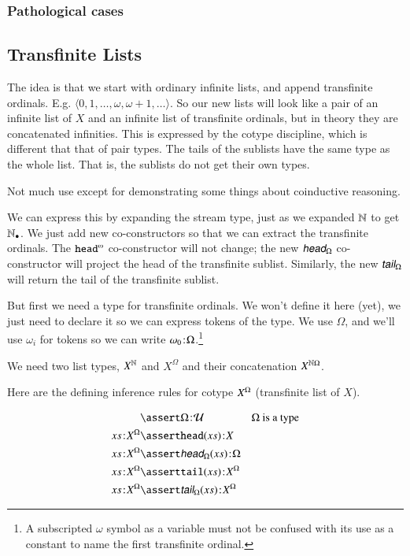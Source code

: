 \subsubsection{Pathological cases}

\subsection{Transfinite Lists}

The idea is that we start with ordinary infinite lists, and append
transfinite ordinals. E.g. \(\langle 0, 1, \ldots, \omega, \omega+1,
\ldots\rangle\). So our new lists will look like a pair of an infinite
list of \(X\) and an infinite list of transfinite ordinals, but in
theory they are concatenated infinities. This is expressed by the
cotype discipline, which is different that that of pair types. The
tails of the sublists have the same type as the whole list. That is,
the sublists do not get their own types.

Not much use except for demonstrating some things about coinductive
reasoning.

We can express this by expanding the stream type, just as we expanded
\(\mathbb{N}\) to get \(\mathbb{N}_{\bullet}\). We just add new co-constructors so that we
can extract the transfinite ordinals. The \(\cohead\) co-constructor
will not change; the new \(\xcohead\) co-constructor will project the
head of the transfinite sublist. Similarly, the new \(\xcotail\) will
return the tail of the transfinite sublist.

But first we need a type for transfinite ordinals. We won't define it
here (yet), we just need to declare it so we can express tokens of the
type. We use \(\Omega\), and we'll use \(\omega_{i}\) for tokens so we
can write \(\omega_0\hspace{1pt}\mathpunct{:}\hspace{-1pt}\Omega\).\footnote{A subscripted \(\omega\)
symbol as a variable must not be confused with its use as a constant
to name the first transfinite ordinal.}

\vspace{2ex}

We need two list types, \(X^{\mathbb{N}}\) and \(X^{\Omega}\) and their
concatenation \(X^{\mathbb{N}\Omega}\).

Here are the defining inference rules for cotype \({X^{\Omega}}\)
(transfinite list of \(X\)).

\begin{align}
  & \linfer \tj{\Omega}{\Univ} & \Omega\ \text{is a type} \\
  \tj{\seq{x}}{\xcolist{X}} & \linfer \tj{\head(\seq{x})}{X} & \\
  \tj{\seq{x}}{\xcolist{X}} & \linfer \tj{\xcohead(\seq{x})}{\Omega} & \\
  \tj{\seq{x}}{\xcolist{X}} & \linfer \tj{\tail(\seq{x})}{\xcolist{X}} & \\
  \tj{\seq{x}}{\xcolist{X}} & \linfer \tj{\xcotail(\seq{x})}{\xcolist{X}} &
\end{align}

